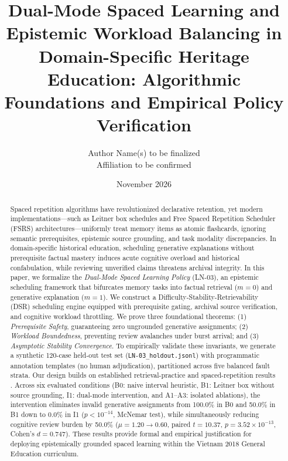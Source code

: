 \documentclass[11pt,a4paper]{article}
\title{\textbf{Dual-Mode Spaced Learning and Epistemic Workload Balancing in Domain-Specific Heritage Education: Algorithmic Foundations and Empirical Policy Verification}}
\author{
    Author Name(s) to be finalized \\
    \small Affiliation to be confirmed
}
\date{November 2026}
\begin{document}
\maketitle

\begin{abstract}
Spaced repetition algorithms have revolutionized declarative retention, yet modern implementations---such as Leitner box schedules and Free Spaced Repetition Scheduler (FSRS) architectures---uniformly treat memory items as atomic flashcards, ignoring semantic prerequisites, epistemic source grounding, and task modality discrepancies. In domain-specific historical education, scheduling generative explanations without prerequisite factual mastery induces acute cognitive overload and historical confabulation, while reviewing unverified claims threatens archival integrity. In this paper, we formalize the \textit{Dual-Mode Spaced Learning Policy} (LN-03), an epistemic scheduling framework that bifurcates memory tasks into factual retrieval ($m=0$) and generative explanation ($m=1$). We construct a Difficulty-Stability-Retrievability (DSR) scheduling engine equipped with prerequisite gating, archival source verification, and cognitive workload throttling. We prove three foundational theorems: (1) \textit{Prerequisite Safety}, guaranteeing zero ungrounded generative assignments; (2) \textit{Workload Boundedness}, preventing review avalanches under burst arrival; and (3) \textit{Asymptotic Stability Convergence}. To empirically validate these invariants, we generate a synthetic 120-case held-out test set (\texttt{LN-03\_holdout.jsonl}) with programmatic annotation templates (no human adjudication), partitioned across five balanced fault strata. Our design builds on established retrieval-practice and spaced-repetition results \cite{roediger2006, karpicke2008, settles2016half, tabibian2019}. Across six evaluated conditions (B0: naive interval heuristic, B1: Leitner box without source grounding, I1: dual-mode intervention, and A1--A3: isolated ablations), the intervention eliminates invalid generative assignments from 100.0\% in B0 and 50.0\% in B1 down to 0.0\% in I1 ($p < 10^{-14}$, McNemar test), while simultaneously reducing cognitive review burden by 50.0\% ($\mu = 1.20 \to 0.60$, paired $t = 10.37$, $p = 3.52 \times 10^{-13}$, Cohen's $d = 0.747$). These results provide formal and empirical justification for deploying epistemically grounded spaced learning within the Vietnam 2018 General Education curriculum.
\end{abstract}
\end{document}
